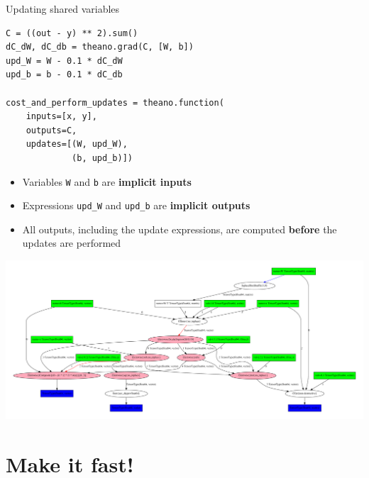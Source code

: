 \documentclass[a4paper,9pt]{beamer}
\begin{document}
\begin{frame}[fragile]{Updating shared variables}
  \begin{verbatim}
C = ((out - y) ** 2).sum()
dC_dW, dC_db = theano.grad(C, [W, b])
upd_W = W - 0.1 * dC_dW
upd_b = b - 0.1 * dC_db

cost_and_perform_updates = theano.function(
    inputs=[x, y],
    outputs=C,
    updates=[(W, upd_W),
             (b, upd_b)])
  \end{verbatim}
  \begin{itemize}
    \item Variables \verb|W| and \verb|b| are {\bf implicit inputs}
    \item Expressions \verb|upd_W| and \verb|upd_b| are {\bf implicit outputs}
    \item All outputs, including the update expressions, are computed {\bf before} the updates are performed
  \end{itemize}
\end{frame}

\begin{frame}
  \includegraphics[width=\textwidth]{pydotprint_cost_and_upd.pdf}
\end{frame}


\section{Make it fast!}
\begin{frame}
  \tableofcontents[currentsection]
\end{frame}
\end{document}
